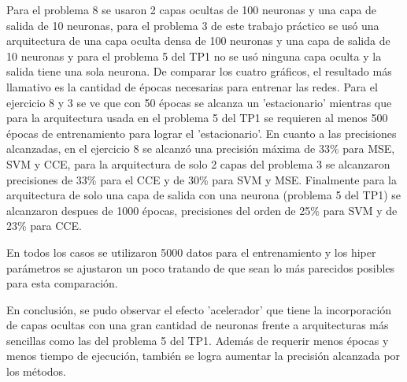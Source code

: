 Para el problema 8 se usaron 2 capas ocultas de 100 neuronas y una capa de salida de 10 neuronas, para el problema 3 de este trabajo práctico se usó una arquitectura de una capa oculta densa de 100 neuronas y una capa de salida de 10 neuronas y para el problema 5 del TP1 no se usó ninguna capa oculta y la salida tiene una sola neurona.
De comparar los cuatro gráficos, el resultado más llamativo es la cantidad de épocas necesarias para entrenar las redes. Para el ejercicio 8 y 3 se ve que con 50 épocas se alcanza un 'estacionario' mientras que para la arquitectura usada en el problema 5 del TP1 se requieren al menos 500 épocas de entrenamiento para lograr el 'estacionario'.
En cuanto a las precisiones alcanzadas, en el ejercicio 8 se alcanzó una precisión máxima de 33\% para MSE, SVM y CCE, para la arquitectura de solo 2 capas del problema 3 se alcanzaron precisiones de 33\% para el CCE y de 30\% para SVM y MSE. Finalmente para la arquitectura de solo una capa de salida con una neurona (problema 5 del TP1) se alcanzaron despues de 1000 épocas, precisiones del orden de 25\% para SVM y de 23\% para CCE.

En todos los casos se utilizaron 5000 datos para el entrenamiento y los hiper parámetros se ajustaron un poco tratando de que sean lo más parecidos posibles para esta comparación.

En conclusión, se pudo observar el efecto 'acelerador' que tiene la incorporación de capas ocultas con una gran cantidad de neuronas frente a arquitecturas más sencillas como las del problema 5 del TP1. Además de requerir menos épocas y menos tiempo de ejecución, también se logra aumentar la precisión alcanzada por los métodos.
